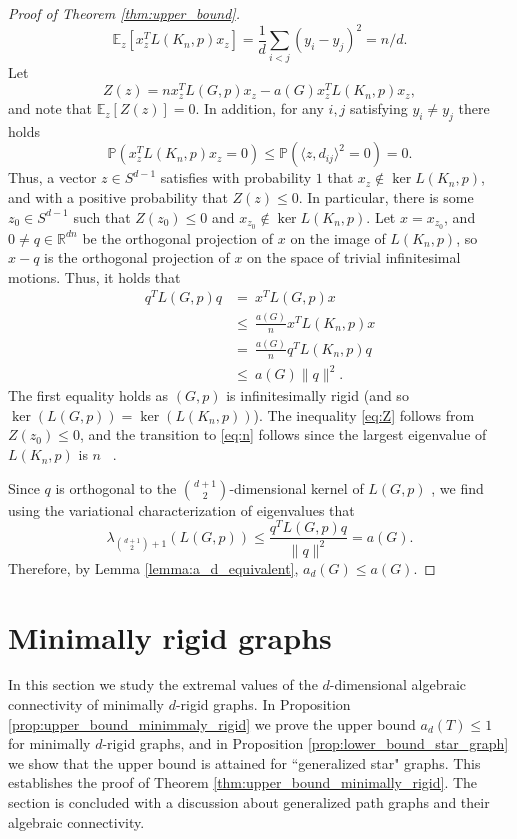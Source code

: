 \documentclass[a4paper,11pt]{article}
\theoremstyle{plain}
\theoremstyle{definition}
\newcommand{\Rea}{{\mathbb R}}
\begin{document}
\begin{proof}[Proof of Theorem \ref{thm:upper_bound}]
\[
\mathbb{E}_z[x_z^T L(K_n,p) x_z]=\frac 1d \sum_{i<j} (y_i-y_j)^2=  n/d.
\]
Let 
\[
    Z(z)= n x_z^T L(G,p) x_z - a(G) x_z^T L(K_n,p) x_z,
\]
and note that $\mathbb E_z[Z(z)]=0$. In addition, for any  $i,j$ satisfying $y_i\ne y_j$ there holds 
$$\mathbb P(x_z^T L(K_n,p) x_z=0) \le \mathbb P(\langle z,d_{ij}\rangle ^2 =0)=0.$$
Thus, a vector $z\in S^{d-1}$ satisfies with probability $1$ that $x_{z}\notin\ker L(K_n,p)$, and with a positive probability that $Z(z)\leq 0$. In particular, there is some $z_0\in S^{d-1}$ such that $Z(z_0)\leq 0$ and $x_{z_0}\notin\ker L(K_n,p)$. 
Let $x=x_{z_0}$, and $0\ne q\in \Rea^{dn}$ be the orthogonal projection of $x$ on the image of $L(K_n,p)$, so $x-q$ is the orthogonal projection of $x$ on the space of trivial infinitesimal motions. 
Thus, it holds that
\begin{align}
\nonumber q^T L(G,p) q &=~ x^T L(G,p) x \\ 
\label{eq:Z}  &\le~ \frac {a(G)}{n} x^TL(K_n,p)x\\
\nonumber  &= ~\frac {a(G)}{n} q^TL(K_n,p)q \\
\label{eq:n} &\le~ a(G)\|q\|^2. 
\end{align}
The first equality holds as $(G,p)$ is infinitesimally rigid (and so $\ker(L(G,p))=\ker(L(K_n,p))$).
The inequality \eqref{eq:Z} follows from $Z(z_0)\le 0$, and the transition to \eqref{eq:n} follows since the largest eigenvalue of $L(K_n,p)$ is $n$ ~\cite[Lemma 4.3]{jordan2022rigidity}. 

Since $q$ is orthogonal to the $\binom {d+1}2$-dimensional kernel of $L(G,p)$
, we find using the variational characterization of eigenvalues that
\[
    \lambda_{\binom{d+1}{2}+1}(L(G,p)) \leq \frac{q^T L(G,p) q}{\|q\|^2} = a(G).
    \]
Therefore, by Lemma \ref{lemma:a_d_equivalent}, $a_d(G)\leq a(G)$.
\end{proof}



\section{Minimally rigid graphs}\label{sec:minimally_rigid}

In this section we study the extremal values of the $d$-dimensional algebraic connectivity of minimally $d$-rigid graphs.   In Proposition \ref{prop:upper_bound_minimmaly_rigid} we prove the upper bound $a_d(T)\leq 1$ for minimally $d$-rigid graphs, and in 
Proposition \ref{prop:lower_bound_star_graph} we show that the upper bound is attained for ``generalized star" graphs. This establishes the proof of Theorem \ref{thm:upper_bound_minimally_rigid}. The section is concluded with a discussion about generalized path graphs and their algebraic connectivity.
\end{document}
